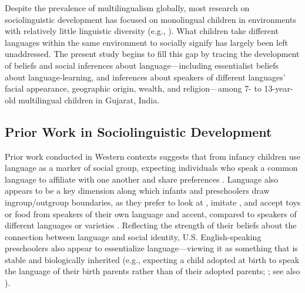 \documentclass{foushee-adapted-preprint}
\begin{document}
Despite the prevalence of multilingualism globally, most research on sociolinguistic development has focused on monolingual children in environments with relatively little linguistic diversity (e.g., \cite{moon1993two, kinzler2007native, shutts2009social, buttelmann2013selective, weatherhead2019preschoolers}). What children take different languages within the same environment to socially signify has largely been left unaddressed. The present study begins to fill this gap by tracing the development of beliefs and social inferences about language---including essentialist beliefs about language-learning, and inferences about speakers of different languages' facial appearance, geographic origin, wealth, and religion---among 7- to 13-year-old multilingual children in Gujarat, India.

\subsection*{Prior Work in Sociolinguistic Development}
Prior work conducted in Western contexts suggests that from infancy children use language as a marker of social group, expecting individuals who speak a common language to affiliate with one another and share preferences \parencite{liberman2017preverbal,liberman2016early}. Language also appears to be a key dimension along which infants and preschoolers draw ingroup/outgroup boundaries, as they prefer to look at \parencite{kinzler2007native}, imitate \parencite{buttelmann2013selective}, and accept toys or food from speakers of their own language and accent, compared to speakers of different languages or varieties \parencite{kinzler2007native,shutts2009social}. Reflecting the strength of their beliefs about the connection between language and social identity, U.S. English-speaking preschoolers also appear to essentialize language---viewing it as something that is stable and biologically inherited (e.g., expecting a child adopted at birth to speak the language of their birth parents rather than of their adopted parents; \cite{hirschfeld1997young}; see also \cite{kinzler2012children}).  
\end{document}
